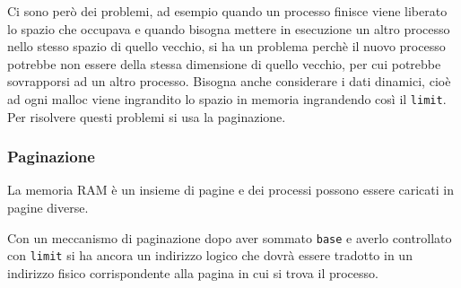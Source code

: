 \documentclass[a4paper]{article}
\theoremstyle{break}
\theoremstyle{break}
\theoremstyle{break}
\theoremstyle{break}
\begin{document}
\noindent Ci sono però dei problemi, ad esempio quando un processo finisce viene liberato lo spazio
che occupava e quando bisogna mettere in esecuzione un altro processo nello stesso spazio
di quello vecchio, si ha un problema perchè il nuovo processo potrebbe non essere della
stessa dimensione di quello vecchio, per cui potrebbe sovrapporsi ad un altro processo.
Bisogna anche considerare i dati dinamici, cioè ad ogni malloc viene ingrandito lo spazio
in memoria ingrandendo così il \texttt{limit}. Per risolvere questi problemi si usa la
paginazione.

\subsubsection{Paginazione}
La memoria RAM è un insieme di pagine e dei processi possono essere caricati in pagine
diverse.
\begin{figure}[H]
  \centering
\end{figure}
\noindent Con un meccanismo di paginazione dopo aver sommato \texttt{base} e averlo controllato
con \texttt{limit} si ha ancora un indirizzo logico che dovrà essere tradotto in un
indirizzo fisico corrispondente alla pagina in cui si trova il processo. 
\end{document}
